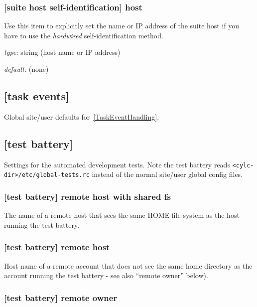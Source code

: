 \subsubsection[host]{[suite host self-identification] \textrightarrow host }

Use this item to explicitly set the name or IP address of the suite host
if you have to use the {\em hardwired} self-identification method.
\begin{myitemize}
\item {\em type:} string (host name or IP address)
\item {\em default:} (none)
\end{myitemize}

\subsection{[task events]}

Global site/user defaults for~\ref{TaskEventHandling}.

\subsection{[test battery]}

Settings for the automated development tests. Note the test battery reads
\lstinline=<cylc-dir>/etc/global-tests.rc= instead of the normal site/user
global config files.

\subsubsection[remote host with shared fs]{[test battery] \textrightarrow remote host with shared fs}

The name of a remote host that sees the same HOME file system as the host running the
test battery.

\subsubsection[remote host]{[test battery] \textrightarrow remote host}

Host name of a remote account that does not see the same home directory as
the account running the test battery - see also ``remote owner'' below).

\subsubsection[remote owner]{[test battery] \textrightarrow remote owner}

